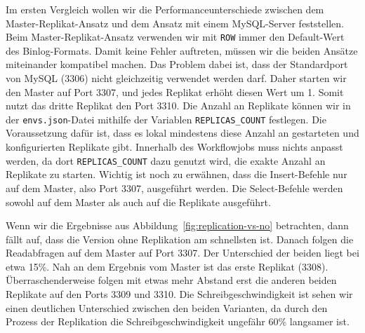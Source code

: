Im ersten Vergleich wollen wir die Performanceunterschiede zwischen dem Master-Replikat-Ansatz und dem Ansatz mit einem MySQL-Server feststellen.
Beim Master-Replikat-Ansatz verwenden wir mit \texttt{ROW} immer den Default-Wert des Binlog-Formats.
Damit keine Fehler auftreten, müssen wir die beiden Ansätze miteinander kompatibel machen.
Das Problem dabei ist, dass der Standardport von MySQL (3306) nicht gleichzeitig verwendet werden darf.
Daher starten wir den Master auf Port 3307, und jedes Replikat erhöht diesen Wert um 1.
Somit nutzt das dritte Replikat den Port 3310.
Die Anzahl an Replikate können wir in der \texttt{envs.json}-Datei mithilfe der Variablen \texttt{REPLICAS\_COUNT} festlegen.
Die Voraussetzung dafür ist, dass es lokal mindestens diese Anzahl an gestarteten und konfigurierten Replikate gibt.
Innerhalb des Workflowjobs muss nichts anpasst werden, da dort \texttt{REPLICAS\_COUNT} dazu genutzt wird, die exakte Anzahl an Replikate zu starten.
Wichtig ist noch zu erwähnen, dass die Insert-Befehle nur auf dem Master, also Port 3307, ausgeführt werden.
Die Select-Befehle werden sowohl auf dem Master als auch auf die Replikate ausgeführt.

Wenn wir die Ergebnisse aus Abbildung~\ref{fig:replication-vs-no} betrachten, dann fällt auf, dass die Version ohne Replikation am schnellsten ist.
Danach folgen die Readabfragen auf dem Master auf Port 3307.
Der Unterschied der beiden liegt bei etwa 15\%.
Nah an dem Ergebnis vom Master ist das erste Replikat (3308).
Überraschenderweise folgen mit etwas mehr Abstand erst die anderen beiden Replikate auf den Ports 3309 und 3310.
Die Schreibgeschwindigkeit ist sehen wir einen deutlichen Unterschied zwischen den beiden Varianten, da durch den Prozess der Replikation die Schreibgeschwindigkeit ungefähr 60\% langsamer ist.

